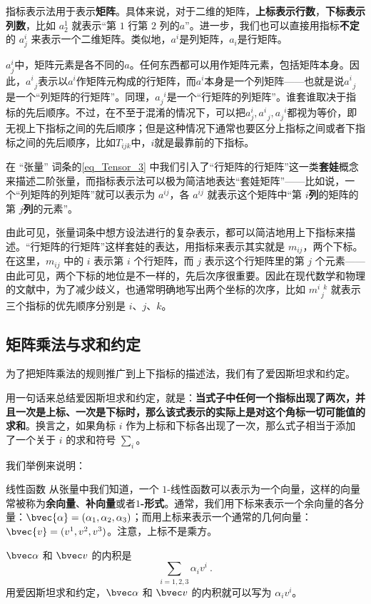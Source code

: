 指标表示法用于表示\textbf{矩阵}。具体来说，对于二维的矩阵，\textbf{上标表示行数}，\textbf{下标表示列数}，比如 $a^1_2$ 就表示“第 $1$ 行第 $2$ 列的$a$”。进一步，我们也可以直接用指标\textbf{不定}的 $a^i_j$ 来表示一个二维矩阵。类似地，$a^i$是列矩阵，$a_i$是行矩阵。

$a^i_j$中，矩阵元素是各不同的$a$。任何东西都可以用作矩阵元素，包括矩阵本身。因此，$a^{i}_{\phantom{1}j}$表示以$a^i$作矩阵元构成的行矩阵，而$a^i$本身是一个列矩阵——也就是说$a^i_{\phantom{1}j}$是一个“列矩阵的行矩阵”。同理，$a^{\phantom{1}i}_j$是一个“行矩阵的列矩阵”。谁套谁取决于指标的先后顺序。不过，在不至于混淆的情况下，可以把$a^i_j, a^i_{\phantom{1}j}, a^{\phantom{1}i}_j$都视为等价，即无视上下指标之间的先后顺序；但是这种情况下通常也要区分上指标之间或者下指标之间的先后顺序，比如$T_{ijk}$中，$i$就是最靠前的下指标。

在 “张量” 词条的\autoref{eq_Tensor_3} 中我们引入了“行矩阵的行矩阵”这一类\textbf{套娃}概念来描述二阶张量，而指标表示法可以极为简洁地表达“套娃矩阵”——比如说，一个“列矩阵的列矩阵”就可以表示为 $a^{ij}$，各 $a^{ij}$ 就表示这个矩阵中“第 $i$\textbf{列}的矩阵的第 $j$\textbf{列}的元素”。

由此可见，张量词条中想方设法进行的复杂表示，都可以简洁地用上下指标来描述。“行矩阵的行矩阵”这样套娃的表达，用指标来表示其实就是 $m_{ij}$，两个下标。在这里，$m_{ij}$ 中的 $i$ 表示第 $i$ 个行矩阵，而 $j$ 表示这个行矩阵里的第 $j$ 个元素——由此可见，两个下标的地位是不一样的，先后次序很重要。因此在现代数学和物理的文献中，为了减少歧义，也通常明确地写出两个坐标的次序，比如 $m^{i\phantom{1}k}_{\phantom{1}j}$ 就表示三个指标的优先顺序分别是 $i$、$j$、$k$。




\subsection{矩阵乘法与求和约定}




为了把矩阵乘法的规则推广到上下指标的描述法，我们有了爱因斯坦求和约定。

用一句话来总结爱因斯坦求和约定，就是：\textbf{当式子中任何一个指标出现了两次，并且一次是上标、一次是下标时，那么该式表示的实际上是对这个角标一切可能值的求和}。换言之，如果角标 $i$ 作为上标和下标各出现了一次，那么式子相当于添加了一个关于 $i$ 的求和符号 $\sum_i$。

我们举例来说明：

\begin{example}{线性函数}
从张量中我们知道，一个 $1$-线性函数可以表示为一个向量，这样的向量常被称为\textbf{余向量}、\textbf{补向量}或者\textbf{$1$-形式}。通常，我们用下标来表示一个余向量的各分量：$\bvec{\alpha}=(\alpha_1, \alpha_2, \alpha_3)$；而用上标来表示一个通常的几何向量：$\bvec{v}=(v^1, v^2, v^3)$。注意，上标不是乘方。

$\bvec\alpha$ 和 $\bvec v$ 的内积是$$\sum\limits_{i=1, 2, 3}\alpha_i v^i~.$$
用爱因斯坦求和约定，$\bvec\alpha$ 和 $\bvec v$ 的内积就可以写为 $\alpha_i v^i$。
\end{example}

